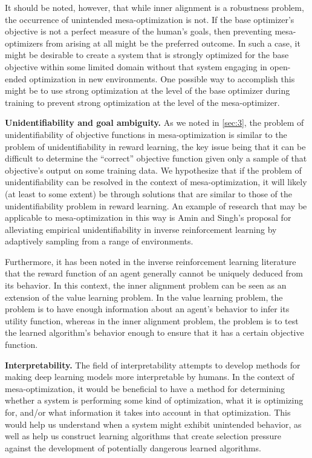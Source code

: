 \documentclass[
  onecolumn,
  natbib,
]{miri-tech-article}
\begin{document}
It should be noted, however, that while inner alignment is a robustness problem, the occurrence of unintended mesa-optimization is not. If the base optimizer's objective is not a perfect measure of the human's goals, then preventing mesa-optimizers from arising at all might be the preferred outcome. In such a case, it might be desirable to create a system that is strongly optimized for the base objective within some limited domain without that system engaging in open-ended optimization in new environments.\cite{drexler} One possible way to accomplish this might be to use strong optimization at the level of the base optimizer during training to prevent strong optimization at the level of the mesa-optimizer.\cite{drexler}

\textbf{Unidentifiability and goal ambiguity.} As we noted in \cref{sec:3}, the problem of unidentifiability of objective functions in mesa-optimization is similar to the problem of unidentifiability in reward learning, the key issue being that it can be difficult to determine the ``correct'' objective function given only a sample of that objective's output on some training data.\cite{irl_unidentifiability} We hypothesize that if the problem of unidentifiability can be resolved in the context of mesa-optimization, it will likely (at least to some extent) be through solutions that are similar to those of the unidentifiability problem in reward learning. An example of research that may be applicable to mesa-optimization in this way is Amin and Singh's\cite{irl_unidentifiability} proposal for alleviating empirical unidentifiability in inverse reinforcement learning by adaptively sampling from a range of environments.

Furthermore, it has been noted in the inverse reinforcement learning literature that the reward function of an agent generally cannot be uniquely deduced from its behavior.\cite{armstrong_preferences} In this context, the inner alignment problem can be seen as an extension of the value learning problem. In the value learning problem, the problem is to have enough information about an agent's behavior to infer its utility function, whereas in the inner alignment problem, the problem is to test the learned algorithm's behavior enough to ensure that it has a certain objective function.

\textbf{Interpretability.} The field of interpretability attempts to develop methods for making deep learning models more interpretable by humans. In the context of mesa-optimization, it would be beneficial to have a method for determining whether a system is performing some kind of optimization, what it is optimizing for, and/or what information it takes into account in that optimization. This would help us understand when a system might exhibit unintended behavior, as well as help us construct learning algorithms that create selection pressure against the development of potentially dangerous learned algorithms.
\end{document}
